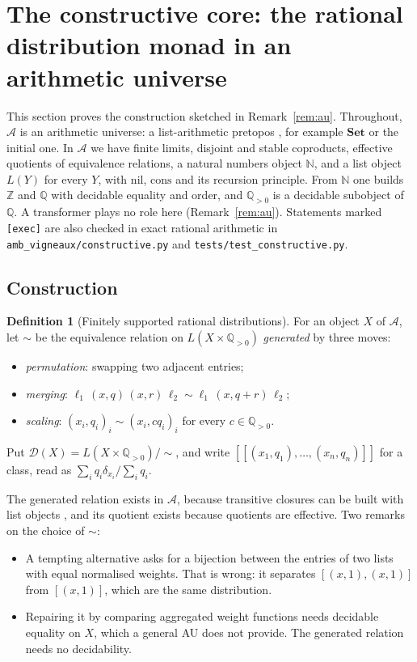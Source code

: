 \documentclass[11pt]{article}
\theoremstyle{definition}
\newtheorem{definition}[theorem]{Definition}
\theoremstyle{remark}
\begin{document}
\section{The constructive core: the rational distribution monad in an arithmetic universe}\label{sec:constructive}
This section proves the construction sketched in Remark~\ref{rem:au}. Throughout, $\mathcal A$ is an arithmetic universe: a list-arithmetic pretopos \cite{joyal73,maietti10}, for example $\mathbf{Set}$ or the initial one. In $\mathcal A$ we have finite limits, disjoint and stable coproducts, effective quotients of equivalence relations, a natural numbers object $\mathbb N$, and a list object $L(Y)$ for every $Y$, with $\mathrm{nil}$, $\mathrm{cons}$ and its recursion principle. From $\mathbb N$ one builds $\mathbb Z$ and $\mathbb Q$ with decidable equality and order, and $\mathbb Q_{>0}$ is a decidable subobject of $\mathbb Q$. A transformer plays no role here (Remark~\ref{rem:au}). Statements marked \texttt{[exec]} are also checked in exact rational arithmetic in \texttt{amb\_vigneaux/constructive.py} and \texttt{tests/test\_constructive.py}.

\subsection*{Construction}
\begin{definition}[Finitely supported rational distributions]\label{def:dq}
For an object $X$ of $\mathcal A$, let $\sim$ be the equivalence relation on $L(X\times\mathbb Q_{>0})$ \emph{generated} by three moves:
\begin{itemize}
  \item[(P)] \emph{permutation}: swapping two adjacent entries;
  \item[(M)] \emph{merging}: $\ell_1\,(x,q)\,(x,r)\,\ell_2\sim\ell_1\,(x,q+r)\,\ell_2$;
  \item[(S)] \emph{scaling}: $(x_i,q_i)_i\sim(x_i,cq_i)_i$ for every $c\in\mathbb Q_{>0}$.
\end{itemize}
Put $\mathcal D(X)=L(X\times\mathbb Q_{>0})/{\sim}$, and write $[\![(x_1,q_1),\dots,(x_n,q_n)]\!]$ for a class, read as $\sum_iq_i\delta_{x_i}/\sum_iq_i$.
\end{definition}
\noindent The generated relation exists in $\mathcal A$, because transitive closures can be built with list objects \cite{maietti10}, and its quotient exists because quotients are effective. Two remarks on the choice of $\sim$:
\begin{itemize}
  \item A tempting alternative asks for a bijection between the entries of two lists with equal normalised weights. That is wrong: it separates $[(x,1),(x,1)]$ from $[(x,1)]$, which are the same distribution.
  \item Repairing it by comparing aggregated weight functions needs decidable equality on $X$, which a general AU does not provide. The generated relation needs no decidability.
\end{itemize}
\end{document}
